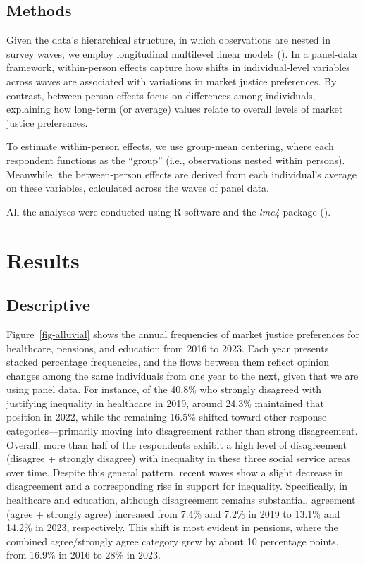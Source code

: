 \documentclass[
  12pt,
]{article}
\begin{document}
\subsection{Methods}\label{methods}

Given the data's hierarchical structure, in which observations are
nested in survey waves, we employ longitudinal multilevel linear models
(). In a
panel-data framework, within-person effects capture how shifts in
individual-level variables across waves are associated with variations
in market justice preferences. By contrast, between-person effects focus
on differences among individuals, explaining how long-term (or average)
values relate to overall levels of market justice preferences.

To estimate within-person effects, we use group-mean centering, where
each respondent functions as the ``group'' (i.e., observations nested
within persons). Meanwhile, the between-person effects are derived from
each individual's average on these variables, calculated across the
waves of panel data.

All the analyses were conducted using R software and the \emph{lme4}
package ().

\section{Results}\label{results}

\subsection{Descriptive}\label{descriptive}

Figure~\ref{fig-alluvial} shows the annual frequencies of market justice
preferences for healthcare, pensions, and education from 2016 to 2023.
Each year presents stacked percentage frequencies, and the flows between
them reflect opinion changes among the same individuals from one year to
the next, given that we are using panel data. For instance, of the
40.8\% who strongly disagreed with justifying inequality in healthcare
in 2019, around 24.3\% maintained that position in 2022, while the
remaining 16.5\% shifted toward other response categories---primarily
moving into disagreement rather than strong disagreement. Overall, more
than half of the respondents exhibit a high level of disagreement
(disagree + strongly disagree) with inequality in these three social
service areas over time. Despite this general pattern, recent waves show
a slight decrease in disagreement and a corresponding rise in support
for inequality. Specifically, in healthcare and education, although
disagreement remains substantial, agreement (agree + strongly agree)
increased from 7.4\% and 7.2\% in 2019 to 13.1\% and 14.2\% in 2023,
respectively. This shift is most evident in pensions, where the combined
agree/strongly agree category grew by about 10 percentage points, from
16.9\% in 2016 to 28\% in 2023.
\end{document}
